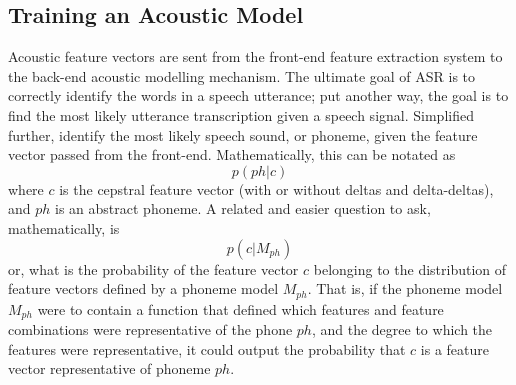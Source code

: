 \subsection{Training an Acoustic Model}\label{sec:acoust-mod}

Acoustic feature vectors are sent from the front-end feature extraction system to the back-end acoustic modelling mechanism.  The ultimate goal of ASR is to correctly identify the words in a speech utterance; put another way, the goal is to find the most likely utterance transcription given a speech signal.  Simplified further, identify the most likely speech sound, or phoneme, given the feature vector passed from the front-end.  Mathematically, this can be notated as \begin{equation} p(ph|c) \end{equation} where $c$ is the cepstral feature vector (with or without deltas and delta-deltas), and $ph$ is an abstract phoneme.  A related and easier question to ask, mathematically, is \begin{equation} p(c|M_{ph}) \end{equation} or, what is the probability of the feature vector $c$ belonging to the distribution of feature vectors defined by a phoneme model $M_{ph}$.  That is, if the phoneme model $M_{ph}$ were to contain a function that defined which features and feature combinations were representative of the phone $ph$, and the degree to which the features were representative, it could output the probability that $c$ is a feature vector representative of phoneme $ph$.

